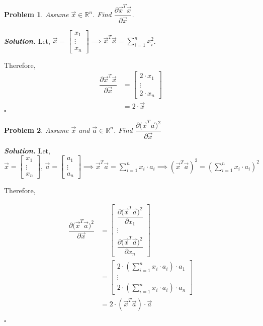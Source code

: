\documentclass[11pt]{amsart}
\newtheorem{problem}{Problem}
\newenvironment{solution}[1][\it{Solution}]{\textbf{#1. } }{$\square$}
\theoremstyle{definition}
\newcommand{\R}{\mathbb{R}}
\newcommand{\va}{\vec{a}}
\newcommand{\vx}{\vec{x}}
\begin{document}
\begin{problem}
Assume $\vx\in \R^n$. Find $\dfrac{\partial \vx^T\vx}{\partial \vx}$.
\end{problem}
\begin{solution}
Let, $\vx = \begin{bmatrix}x_1\\\vdots\\x_n\end{bmatrix} \implies  \vx^T\vx = \sum_{i=1}^{n}x_i^2$.

Therefore,
\begin{align*}\dfrac{\partial{\vx^T\vx}}{\partial\vx} &= \begin{bmatrix}2\cdot x_1\\\vdots\\ 2 \cdot x_n\end{bmatrix}\\
&= \boxed{2 \cdot \vx}
\end{align*}
\end{solution}


\begin{problem}
Assume $\vx$ and $\va\in \R^n$. Find $\dfrac{\partial \big(\vx^T\va\big)^2}{\partial \vx}$
\end{problem}

\begin{solution}
Let, $\vx = \begin{bmatrix}x_1\\\vdots\\x_n\end{bmatrix}\text{, } \va = \begin{bmatrix}a_1\\\vdots\\a_n\end{bmatrix} \implies \vx^T\va = \sum_{i=1}^{n}x_i \cdot a_i \implies (\vx^T\va)^2 = (\sum_{i=1}^{n}x_i \cdot a_i)^2$

Therefore,

\begin{align*}
\dfrac{\partial \big(\vx^T\va\big)^2}{\partial \vx} &= \begin{bmatrix}\dfrac{\partial \big(\vx^T\va\big)^2}{\partial x_1}\\\vdots\\\dfrac{\partial \big(\vx^T\va\big)^2}{\partial x_n}\end{bmatrix}\\
&= \begin{bmatrix}2 \cdot (\sum_{i=1}^{n}x_i \cdot a_i) \cdot a_1\\\vdots\\ 2 \cdot (\sum_{i=1}^{n}x_i \cdot a_i) \cdot a_n\end{bmatrix}\\
&= \boxed{2 \cdot (\vx^T \va) \cdot \va}
\end{align*}



\end{solution}
\end{document}
